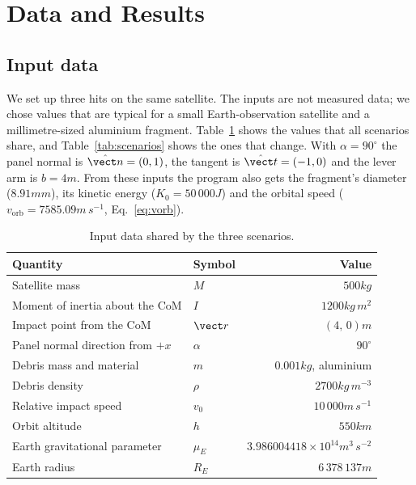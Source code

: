 \newpage
\section{Data and Results}
\label{sec:data-results}

\subsection{Input data}

We set up three hits on the same satellite. The inputs are not measured
data; we chose values that are typical for a small Earth-observation
satellite and a millimetre-sized aluminium fragment.
Table~\ref{tab:inputs} shows the values that all scenarios share, and
Table~\ref{tab:scenarios} shows the ones that change. With
$\alpha=90^\circ$ the panel normal is $\hat{\vect n}=(0,1)$, the tangent
is $\hat{\vect t}=(-1,0)$ and the lever arm is $b=4\unit{m}$. From these
inputs the program also gets the fragment's diameter ($8.91\unit{mm}$),
its kinetic energy ($K_0=50\,000\unit{J}$) and the orbital speed
($v_{\mathrm{orb}}=7585.09\unit{m\,s^{-1}}$, Eq.~\eqref{eq:vorb}).

\begin{table}[H]
  \centering\footnotesize
  \caption{Input data shared by the three scenarios.}
  \label{tab:inputs}
  \begin{tabular}{@{}llr@{}}
    \toprule
    Quantity & Symbol & Value \\
    \midrule
    Satellite mass & $M$ & $500\unit{kg}$ \\
    Moment of inertia about the CoM & $I$ & $1200\unit{kg\,m^2}$ \\
    Impact point from the CoM & $\vect r$ & $(4,\,0)\unit{m}$ \\
    Panel normal direction from $+x$ & $\alpha$ & $90^\circ$ \\
    Debris mass and material & $m$ & $0.001\unit{kg}$, aluminium \\
    Debris density & $\rho$ & $2700\unit{kg\,m^{-3}}$ \\
    Relative impact speed & $v_0$ & $10\,000\unit{m\,s^{-1}}$ \\
    Orbit altitude & $h$ & $550\unit{km}$ \\
    Earth gravitational parameter & $\mu_E$ & $3.986004418\times10^{14}\unit{m^3\,s^{-2}}$ \\
    Earth radius & $R_E$ & $6\,378\,137\unit{m}$ \\
    \bottomrule
  \end{tabular}
\end{table}

